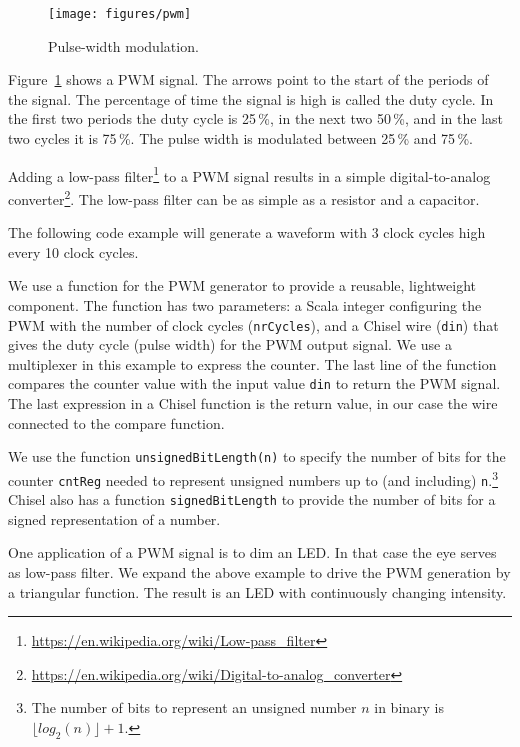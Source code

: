 \documentclass[%
    10pt,
    headinclude, footexclude,
    openright, %
    notitlepage,
    cleardoubleempty,
    headsepline,
    pointlessnumbers,
    bibtotoc, idxtotoc,
    ]{scrbook}
\newcommand{\code}[1]{{\lstinline[basicstyle=\small\ttfamily]{#1}}}
\newcommand{\myref}[2]{\href{#1}{#2}}
\renewcommand{\myref}[2]{{#2}{\footnote{\url{#1}}}}
\begin{document}
\begin{figure}
  \centering
  \texttt{[image: figures/pwm]}
  \caption{Pulse-width modulation.}
  \label{fig:pwm}
\end{figure}

Figure~\ref{fig:pwm} shows a PWM signal. The arrows point to the start of the periods
of the signal. The percentage of time the signal is high is called the duty cycle.
In the first two periods the duty cycle is 25\,\%, in the next two 50\,\%, and in the last
two cycles it is 75\,\%. The pulse width is modulated between 25\,\% and 75\,\%.

Adding a \myref{https://en.wikipedia.org/wiki/Low-pass_filter}{low-pass filter} to a PWM
signal results in a simple
\myref{https://en.wikipedia.org/wiki/Digital-to-analog_converter}{digital-to-analog converter}.
The low-pass filter can be as simple as a resistor and a capacitor.

The following code example will generate a waveform with 3 clock cycles high every 10 clock cycles.


\noindent We use a function for the PWM generator to provide a reusable, lightweight component.
The function has two parameters: a Scala integer configuring the PWM with the number of
clock cycles (\code{nrCycles}), and a Chisel wire (\code{din}) that gives the duty cycle (pulse width) for the
PWM output signal. We use a multiplexer in this
example to express the counter. The last line of the function compares the counter value
with the input value \code{din} to return the PWM signal. The last expression in a Chisel function
is the return value, in our case the wire connected to the compare function.

We use the function \code{unsignedBitLength(n)} to specify the number of bits for the counter
\code{cntReg} needed to represent unsigned numbers up to (and including)
\code{n}.\footnote{The number of bits to represent an unsigned number $n$ in binary is $\lfloor log_2(n) \rfloor + 1$.}
Chisel also has a function \code{signedBitLength} to provide the number of bits
for a signed representation of a number.


One application of a PWM signal is to dim an LED. In that case the eye serves as low-pass
filter. We expand the above example to drive the PWM generation by a triangular function.
The result is an LED with continuously changing intensity.

\end{document}
